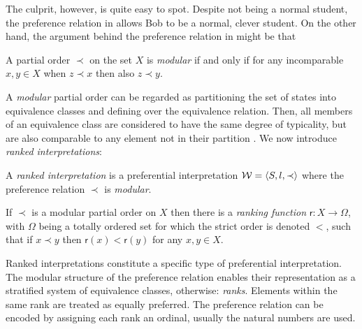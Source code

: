 The culprit, however, is quite easy to spot. Despite not being a normal student, the preference relation in
 allows Bob to be a normal, clever student. On the other hand, the argument behind the preference
relation in  might be that 

\begin{definition}
	\label{definition:modular-order} 

	A partial order $\prec$ on the set $X$ is \emph{modular} if and only if for any incomparable $x,y \in X$ when $z \prec
	x$ then also $z \prec y$.
\end{definition}

A \textit{modular} partial order can be regarded as partitioning the set of states into equivalence classes and defining
over the equivalence relation. Then, all members of an equivalence class are considered to have the same degree of typicality,
but are also comparable to any element not in their partition \cite{GinsberCounterfactuals}. We now introduce \textit{ranked
interpretations}:

\begin{definition}
	\label{definition:ranked-interpretation}

	A \emph{ranked interpretation} is a preferential interpretation $\mathcal{W} = \langle S,l,\prec \rangle$ where the preference relation $\prec$ is \emph{modular}.
\end{definition}

\begin{lemma}
	\label{lemma:modular-ranking-function}

	If $\prec$ is a modular partial order on $X$ then there is a \emph{ranking function} $\mathsf{r}\colon X \to \Omega$,
	with $\Omega$ being a totally ordered set for which the strict order is denoted $<$, such that if $x \prec y$ then $\mathsf{r}
	(x) < \mathsf{r}(y)$ for any $x,y \in X$.
\end{lemma}

Ranked interpretations constitute a specific type of preferential interpretation. The modular structure of the preference
relation enables their representation as a stratified system of equivalence classes, otherwise: \textit{ranks}. Elements
within the same rank are treated as equally preferred. The preference relation can be encoded by assigning each rank an
ordinal, usually the natural numbers are used.

